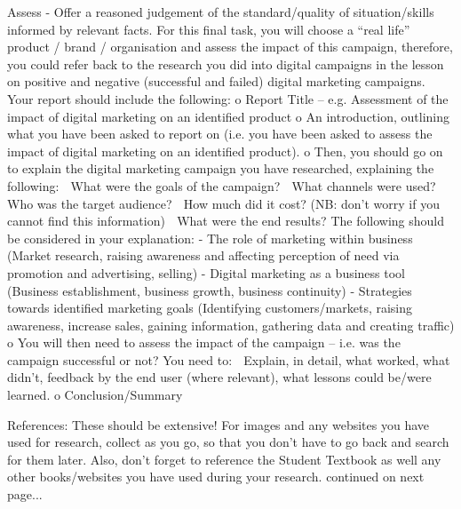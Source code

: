 \documentclass{article}
\begin{document}
Assess - Offer a reasoned judgement of the standard/quality of situation/skills informed by relevant facts.
For this final task, you will choose a “real life” product / brand / organisation and assess the impact of this
campaign, therefore, you could refer back to the research you did into digital campaigns in the lesson on positive
and negative (successful and failed) digital marketing campaigns.
Your report should include the following:
o Report Title – e.g. Assessment of the impact of digital marketing on an identified product
o An introduction, outlining what you have been asked to report on (i.e. you have been asked to
assess the impact of digital marketing on an identified product).
o Then, you should go on to explain the digital marketing campaign you have researched, explaining
the following:
 What were the goals of the campaign?
 What channels were used?
 Who was the target audience?
 How much did it cost? (NB: don’t worry if you cannot find this information)
 What were the end results?
The following should be considered in your explanation:
- The role of marketing within business (Market research, raising awareness and affecting perception of
need via promotion and advertising, selling)
- Digital marketing as a business tool (Business establishment, business growth, business continuity)
- Strategies towards identified marketing goals (Identifying customers/markets, raising awareness,
increase sales, gaining information, gathering data and creating traffic)
o You will then need to assess the impact of the campaign – i.e. was the campaign successful or
not? You need to:
 Explain, in detail, what worked, what didn’t, feedback by the end user (where relevant),
what lessons could be/were learned.
o Conclusion/Summary


References:
These should be extensive! For images and any websites you have used for research, collect as you go, so
that you don’t have to go back and search for them later. Also, don’t forget to reference the Student
Textbook as well any other books/websites you have used during your research.
continued on next page...
\end{document}
